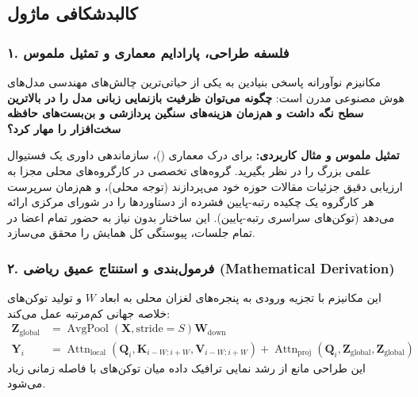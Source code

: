 \subsection{کالبدشکافی ماژول }

\subsubsection*{۱. فلسفه طراحی، پارادایم معماری و تمثیل ملموس}
مکانیزم نوآورانه  پاسخی بنیادین به یکی از حیاتی‌ترین چالش‌های مهندسی مدل‌های هوش مصنوعی مدرن است: \textbf{چگونه می‌توان ظرفیت بازنمایی زبانی مدل را در بالاترین سطح نگه داشت و هم‌زمان هزینه‌های سنگین پردازشی و بن‌بست‌های حافظه سخت‌افزار را مهار کرد؟}

\textbf{تمثیل ملموس و مثال کاربردی:}
برای درک معماری  ()، سازماندهی داوری یک فستیوال علمی بزرگ را در نظر بگیرید. گروه‌های تخصصی در کارگروه‌های محلی مجزا به ارزیابی دقیق جزئیات مقالات حوزه خود می‌پردازند (توجه محلی)، و هم‌زمان سرپرست هر کارگروه یک چکیده رتبه-پایین فشرده از دستاوردها را در شورای مرکزی ارائه می‌دهد (توکن‌های سراسری رتبه-پایین). این ساختار بدون نیاز به حضور تمام اعضا در تمام جلسات، پیوستگی کل همایش را محقق می‌سازد.

\subsubsection*{۲. فرمول‌بندی و استنتاج عمیق ریاضی (Mathematical Derivation)}
این مکانیزم با تجزیه ورودی به پنجره‌های لغزان محلی به ابعاد $W$ و تولید توکن‌های خلاصه جهانی کم‌مرتبه عمل می‌کند:
\begin{align}
\mathbf{Z}_{\text{global}} &= \operatorname{AvgPool}(\mathbf{X}, \text{stride}=S) \mathbf{W}_{\text{down}} \\
\mathbf{Y}_i &= \operatorname{Attn}_{\text{local}}(\mathbf{Q}_i, \mathbf{K}_{i-W:i+W}, \mathbf{V}_{i-W:i+W}) + \operatorname{Attn}_{\text{proj}}(\mathbf{Q}_i, \mathbf{Z}_{\text{global}}, \mathbf{Z}_{\text{global}})
\end{align}
این طراحی مانع از رشد نمایی ترافیک داده میان توکن‌های با فاصله زمانی زیاد می‌شود.

